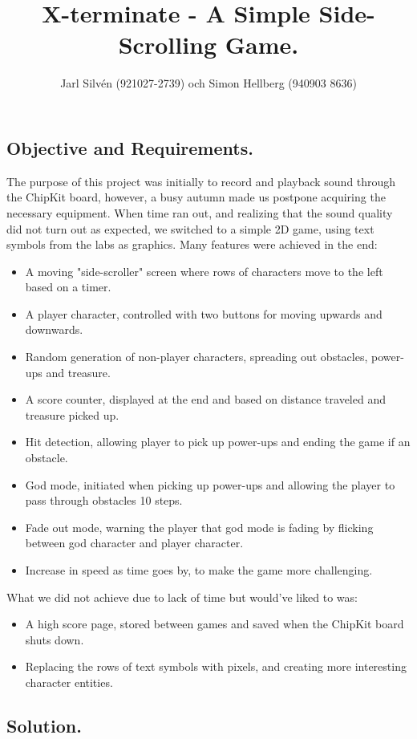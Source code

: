 \documentclass[a4paper,11pt,twoside]{article}
\title{X-terminate - A Simple Side-Scrolling Game.}
\author{Jarl Silvén (921027-2739) och Simon Hellberg (940903 8636)}
\date{\thedate}
\begin{document}
\maketitle

\newpage

\subsection*{Objective and Requirements.}
The purpose of this project was initially to record and playback sound through the ChipKit board, however, a busy autumn made us postpone acquiring the necessary equipment. When time ran out, and realizing that the sound quality did not turn out as expected, we switched to a simple 2D game, using text symbols from the labs as graphics. Many features were achieved in the end:
\begin{itemize}
\item A moving "side-scroller" screen where rows of characters move to the left based on a timer.
\item A player character, controlled with two buttons for moving upwards and downwards.
\item Random generation of non-player characters, spreading out obstacles, power-ups and treasure.
\item A score counter, displayed at the end and based on distance traveled and treasure picked up.
\item Hit detection, allowing player to pick up power-ups and ending the game if an obstacle.
\item God mode, initiated when picking up power-ups and allowing the player to pass through obstacles 10 steps.
\item Fade out mode, warning the player that god mode is fading by flicking between god character and player character.
\item Increase in speed as time goes by, to make the game more challenging.
\end{itemize}
What we did not achieve due to lack of time but would've liked to was:
\begin{itemize}
\item A high score page, stored between games and saved when the ChipKit board shuts down.
\item Replacing the rows of text symbols with pixels, and creating more interesting character entities.
\end{itemize}

\subsection*{Solution.}
\end{document}

